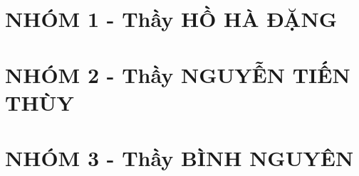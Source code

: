 \documentclass[12pt,a4paper,oneside]{book}
\renewcommand{\baselinestretch}{1.4}
\begin{document}
	
	\pagestyle{empty}
	\renewcommand{\headrulewidth}{0.4pt}
	\renewcommand{\baselinestretch}{1.3}
	
	
	\pagestyle{fancy}
\newpage
	\chead{\empty}
	\rhead{\currfilename}
	\lfoot{\empty}
	\tableofcontents

\chapter{NHÓM 1 - Thầy HỒ HÀ ĐẶNG}

\newpage
\newpage
\newpage
\newpage
\newpage
\newpage
\newpage
\newpage
\newpage
\newpage
\newpage
\newpage
\newpage
\newpage

\chapter{NHÓM 2 - Thầy NGUYỄN TIẾN THÙY}

\newpage
\newpage
\newpage
\newpage
\newpage
\newpage
\newpage
\newpage
\newpage
\newpage
\newpage
\newpage
\newpage
\newpage

\chapter{NHÓM 3 - Thầy BÌNH NGUYÊN}

\newpage
\newpage
\newpage
\newpage
\newpage
\newpage
\newpage
\newpage
\newpage
\newpage
\end{document}
